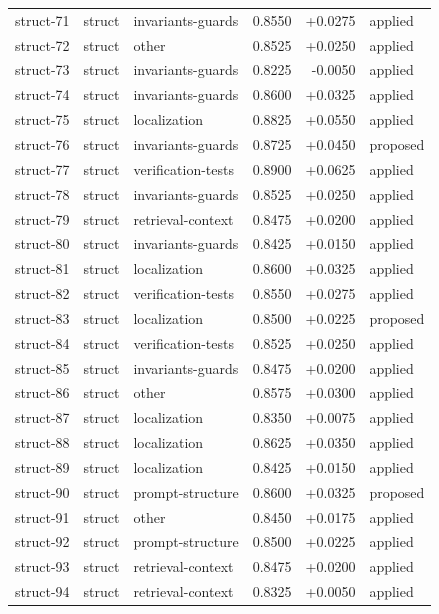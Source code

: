 \begin{center}
\begin{longtable}{llp{5.2cm}rrl}
struct-71 & struct & invariants-guards & 0.8550 & +0.0275 & applied \\
struct-72 & struct & other & 0.8525 & +0.0250 & applied \\
struct-73 & struct & invariants-guards & 0.8225 & -0.0050 & applied \\
struct-74 & struct & invariants-guards & 0.8600 & +0.0325 & applied \\
struct-75 & struct & localization & 0.8825 & +0.0550 & applied \\
struct-76 & struct & invariants-guards & 0.8725 & +0.0450 & proposed \\
struct-77 & struct & verification-tests & 0.8900 & +0.0625 & applied \\
struct-78 & struct & invariants-guards & 0.8525 & +0.0250 & applied \\
struct-79 & struct & retrieval-context & 0.8475 & +0.0200 & applied \\
struct-80 & struct & invariants-guards & 0.8425 & +0.0150 & applied \\
struct-81 & struct & localization & 0.8600 & +0.0325 & applied \\
struct-82 & struct & verification-tests & 0.8550 & +0.0275 & applied \\
struct-83 & struct & localization & 0.8500 & +0.0225 & proposed \\
struct-84 & struct & verification-tests & 0.8525 & +0.0250 & applied \\
struct-85 & struct & invariants-guards & 0.8475 & +0.0200 & applied \\
struct-86 & struct & other & 0.8575 & +0.0300 & applied \\
struct-87 & struct & localization & 0.8350 & +0.0075 & applied \\
struct-88 & struct & localization & 0.8625 & +0.0350 & applied \\
struct-89 & struct & localization & 0.8425 & +0.0150 & applied \\
struct-90 & struct & prompt-structure & 0.8600 & +0.0325 & proposed \\
struct-91 & struct & other & 0.8450 & +0.0175 & applied \\
struct-92 & struct & prompt-structure & 0.8500 & +0.0225 & applied \\
struct-93 & struct & retrieval-context & 0.8475 & +0.0200 & applied \\
struct-94 & struct & retrieval-context & 0.8325 & +0.0050 & applied \\

\end{longtable}
\end{center}
